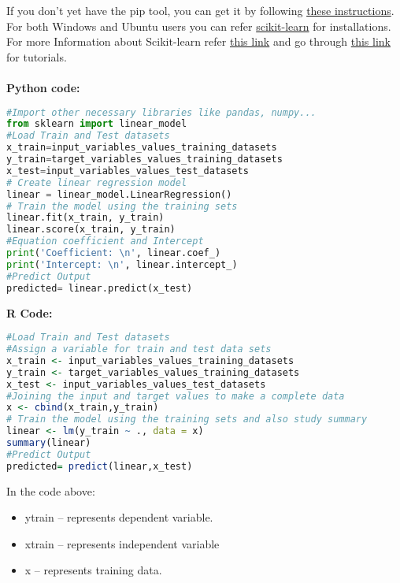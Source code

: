 \documentclass[Proceedings]{ascelike}
\begin{document}
If you don't yet have the pip tool, you can get it by following \href{https://pip.pypa.io/en/latest/installing/}{these instructions}.
\\For both Windows and Ubuntu users you can refer \href{http://scikit-learn.org/stable/developers/advanced_installation.html#advanced-installation}{scikit-learn} for installations.\\
For more Information about Scikit-learn refer \href{http://scikit-learn.org/stable/}{this link} and go through \href{http://scikit-learn.org/stable/tutorial/index.html}{this link} for tutorials.\\
\\\textbf{Python code:}
\begin{lstlisting}[language=Python]
#Import other necessary libraries like pandas, numpy...
from sklearn import linear_model
#Load Train and Test datasets
x_train=input_variables_values_training_datasets
y_train=target_variables_values_training_datasets
x_test=input_variables_values_test_datasets
# Create linear regression model
linear = linear_model.LinearRegression()
# Train the model using the training sets 
linear.fit(x_train, y_train)
linear.score(x_train, y_train)
#Equation coefficient and Intercept
print('Coefficient: \n', linear.coef_)
print('Intercept: \n', linear.intercept_)
#Predict Output
predicted= linear.predict(x_test)
\end{lstlisting}
\textbf{R Code:}
\begin{lstlisting}[language=R]
#Load Train and Test datasets
#Assign a variable for train and test data sets
x_train <- input_variables_values_training_datasets
y_train <- target_variables_values_training_datasets
x_test <- input_variables_values_test_datasets
#Joining the input and target values to make a complete data
x <- cbind(x_train,y_train)
# Train the model using the training sets and also study summary
linear <- lm(y_train ~ ., data = x)
summary(linear)
#Predict Output
predicted= predict(linear,x_test) 
\end{lstlisting}
In the code above:
\begin{itemize}
	\item y\textunderscore train – represents dependent variable.
	\item x\textunderscore train – represents independent variable
	\item x – represents training data.
\end{itemize}
\end{document}
